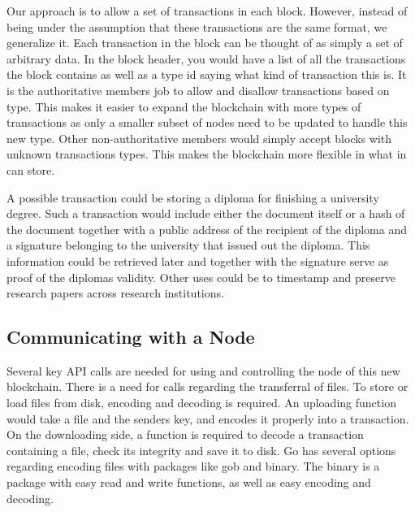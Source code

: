 \documentclass[12pt]{article}
\begin{document}
Our approach is to allow a set of transactions in each block. However, instead of being under the assumption that these transactions are the same format, we generalize it. Each transaction in the block can be thought of as simply a set of arbitrary data. In the block header, you would have a list of all the transactions the block contains as well as a type id saying what kind of transaction this is. It is the authoritative members job to allow and disallow transactions based on type. This makes it easier to expand the blockchain with more types of transactions as only a smaller subset of nodes need to be updated to handle this new type. Other non-authoritative members would simply accept blocks with unknown transactions types. This makes the blockchain more flexible in what in can store.


A possible transaction could be storing a diploma for finishing a university degree. Such a transaction would include either the document itself or a hash of the document together with a public address of the recipient of the diploma and a signature belonging to the university that issued out the diploma. This information could be retrieved later and together with the signature serve as proof of the diplomas validity. Other uses could be to timestamp and preserve research papers across research institutions. 

\subsection{Communicating with a Node}
 
Several key API calls are needed for using and controlling the node of this new blockchain. There is a need for calls regarding the transferral of files. To store or load files from disk, encoding and decoding is required. An uploading function would take a file and the senders key, and encodes it properly into a transaction. On the downloading side, a function is required to decode a transaction containing a file, check its integrity and save it to disk. Go has several options regarding encoding files with  packages like gob and binary. The binary is a package with easy read and write functions, as well as easy encoding and decoding. %
\end{document}
